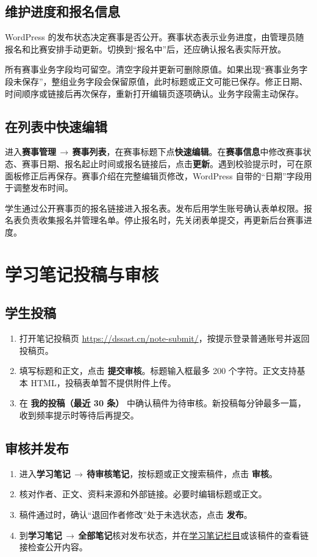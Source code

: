 \documentclass[UTF8,a4paper,zihao=-4,fontset=fandol]{ctexart}
\newcommand{\menu}[2]{\textbf{#1}\,\ensuremath{\rightarrow}\,\textbf{#2}}
\begin{document}
\subsection{维护进度和报名信息}
WordPress 的发布状态决定赛事是否公开。赛事状态表示业务进度，由管理员随报名和比赛安排手动更新。切换到“报名中”后，还应确认报名表实际开放。

所有赛事业务字段均可留空。清空字段并更新可删除原值。如果出现“赛事业务字段未保存”，整组业务字段会保留原值，此时标题或正文可能已保存。修正日期、时间顺序或链接后再次保存，重新打开编辑页逐项确认。业务字段需主动保存。

\subsection{在列表中快速编辑}
进入\menu{赛事管理}{赛事列表}，在赛事标题下点\textbf{快速编辑}。在\textbf{赛事信息}中修改赛事状态、赛事日期、报名起止时间或报名链接后，点击\textbf{更新}。遇到校验提示时，可在原面板修正后再保存。赛事介绍在完整编辑页修改，WordPress 自带的“日期”字段用于调整发布时间。

学生通过公开赛事页的报名链接进入报名表。发布后用学生账号确认表单权限。报名表负责收集报名并管理名单。停止报名时，先关闭表单提交，再更新后台赛事进度。

\section{学习笔记投稿与审核}

\subsection{学生投稿}
\begin{enumerate}
  \item 打开笔记投稿页 \url{https://dssast.cn/note-submit/}，按提示登录普通账号并返回投稿页。
  \item 填写标题和正文，点击 \textbf{提交审核}。标题输入框最多 200 个字符。正文支持基本 HTML，投稿表单暂不提供附件上传。
  \item 在 \textbf{我的投稿（最近 30 条）} 中确认稿件为待审核。新投稿每分钟最多一篇，收到频率提示时等待后再提交。
\end{enumerate}

\subsection{审核并发布}
\begin{enumerate}
  \item 进入\menu{学习笔记}{待审核笔记}，按标题或正文搜索稿件，点击 \textbf{审核}。
  \item 核对作者、正文、资料来源和外部链接。必要时编辑标题或正文。
  \item 稿件通过时，确认“退回作者修改”处于未选状态，点击 \textbf{发布}。
  \item 到\menu{学习笔记}{全部笔记}核对发布状态，并在\href{https://dssast.cn/notes/}{学习笔记栏目}或该稿件的查看链接检查公开内容。
\end{enumerate}
\end{document}
